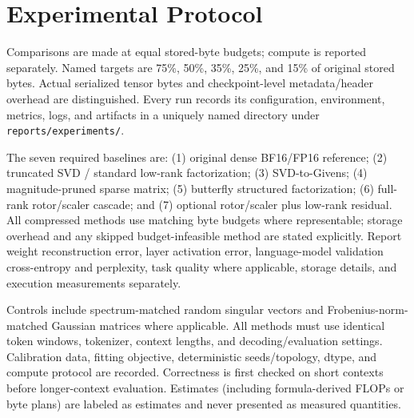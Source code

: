 \section{Experimental Protocol}
\label{sec:experiments}
Comparisons are made at equal stored-byte budgets; compute is reported separately. Named targets are 75\%, 50\%, 35\%, 25\%, and 15\% of original stored bytes. Actual serialized tensor bytes and checkpoint-level metadata/header overhead are distinguished. Every run records its configuration, environment, metrics, logs, and artifacts in a uniquely named directory under \texttt{reports/experiments/}.

The seven required baselines are: (1) original dense BF16/FP16 reference; (2) truncated SVD / standard low-rank factorization; (3) SVD-to-Givens; (4) magnitude-pruned sparse matrix; (5) butterfly structured factorization; (6) full-rank rotor/scaler cascade; and (7) optional rotor/scaler plus low-rank residual. All compressed methods use matching byte budgets where representable; storage overhead and any skipped budget-infeasible method are stated explicitly. Report weight reconstruction error, layer activation error, language-model validation cross-entropy and perplexity, task quality where applicable, storage details, and execution measurements separately.

Controls include spectrum-matched random singular vectors and Frobenius-norm-matched Gaussian matrices where applicable. All methods must use identical token windows, tokenizer, context lengths, and decoding/evaluation settings. Calibration data, fitting objective, deterministic seeds/topology, dtype, and compute protocol are recorded. Correctness is first checked on short contexts before longer-context evaluation. Estimates (including formula-derived FLOPs or byte plans) are labeled as estimates and never presented as measured quantities.
